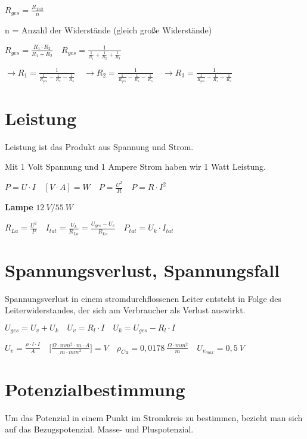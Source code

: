 $\boxed{R_{ges} = \frac{R_{Teil}}{n}}$

n = Anzahl der Widerstände (gleich große Widerstände)

$\boxed{R_{ges} = \frac{R_1 \cdot R_2}{R_1 + R_2}} \quad R_{ges} = \frac{1}{\frac{1}{R_1} + \frac{1}{R_2} + \frac{1}{R_3}}$

$\to R_{1} = \frac{1}{\frac{1}{R_{ges}} - \frac{1}{R_2} - \frac{1}{R_3}} \quad \to R_{2} = \frac{1}{\frac{1}{R_{ges}} - \frac{1}{R_1} - \frac{1}{R_3}} \quad \to R_{3} = \frac{1}{\frac{1}{R_{ges}} - \frac{1}{R_1} - \frac{1}{R_2}}$

\section{Leistung}\label{leistung}

Leistung ist das Produkt aus Spannung und Strom.

Mit 1 Volt Spannung und 1 Ampere Strom haben wir 1 Watt Leistung.

$\boxed{P = U \cdot I} \quad [V \cdot A] = W \quad \boxed{P = \frac{U^2}{R}} \quad \boxed{P = R \cdot I^2}$

\textbf{Lampe} $12~V/55~W$

$R_{La} = \frac{U^2}{P} \quad I_{tat} = \frac{U_k}{R_{La}} = \frac{U_{ges} - U_v}{R_{La}} \quad P_{tat} = U_k \cdot I_{tat}$

\section{Spannungsverlust,
Spannungsfall}\label{spannungsverlust-spannungsfall}

Spannungsverlust in einem stromdurchflossenen Leiter entsteht in Folge
des Leiterwiderstandes, der sich am Verbraucher als Verlust auswirkt.

$U_{ges} = U_v + U_k \quad U_v = R_l \cdot I \quad U_k = U_{ges} - R_l \cdot I$

$\boxed{U_v = \frac{\rho \cdot l \cdot I}{A}} \quad \bigl[\frac{\Omega \cdot mm^2 \cdot m \cdot A}{m \cdot mm^2}\bigl] = V \quad \rho_{Cu} = 0,0178~\frac{\Omega \cdot mm^2}{m} \quad \boxed{U_{v_{max}} = 0,5~V}$

\section{Potenzialbestimmung}\label{potenzialbestimmung}

Um das Potenzial in einem Punkt im Stromkreis zu bestimmen, bezieht man
sich auf das Bezugspotenzial. Masse- und Pluspotenzial.
